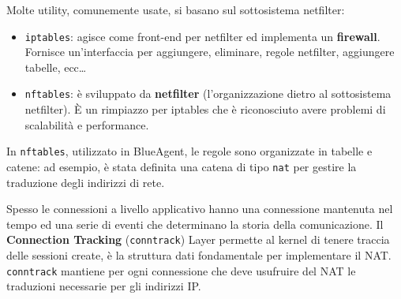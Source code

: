 Molte utility, comunemente usate, si basano sul sottosistema netfilter:

\begin{itemize}
\tightlist
\item
  \passthrough{\lstinline!iptables!}: agisce come front-end per
  netfilter ed implementa un \textbf{firewall}. Fornisce un'interfaccia
  per aggiungere, eliminare, regole netfilter, aggiungere tabelle,
  ecc\ldots{}
\item
  \passthrough{\lstinline!nftables!}: è sviluppato da \textbf{netfilter}
  (l'organizzazione dietro al sottosistema netfilter). È un rimpiazzo
  per iptables che è riconosciuto avere problemi di scalabilità e
  performance.
\end{itemize}

In \passthrough{\lstinline!nftables!}, utilizzato in BlueAgent, le
regole sono organizzate in tabelle e catene: ad esempio, è stata
definita una catena di tipo \passthrough{\lstinline!nat!} per gestire la
traduzione degli indirizzi di rete.

Spesso le connessioni a livello applicativo hanno una connessione
mantenuta nel tempo ed una serie di eventi che determinano la storia
della comunicazione. Il \textbf{Connection Tracking}
(\passthrough{\lstinline!conntrack!}) Layer permette al kernel di tenere
traccia delle sessioni create, è la struttura dati fondamentale per
implementare il NAT. \passthrough{\lstinline!conntrack!} mantiene per
ogni connessione che deve usufruire del NAT le traduzioni necessarie per
gli indirizzi IP.
